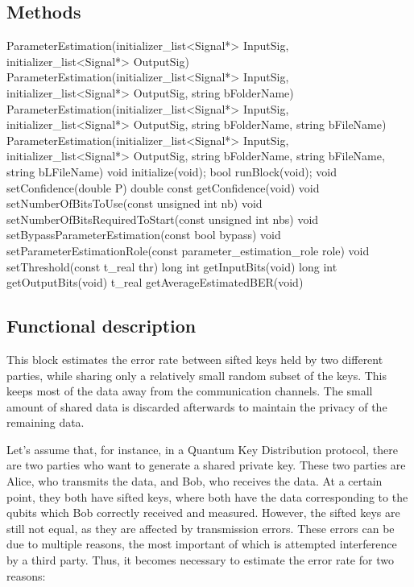 \subsection*{Methods}
\bigbreak	
ParameterEstimation(initializer\_list<Signal*> InputSig, initializer\_list<Signal*> OutputSig)
\bigbreak	
ParameterEstimation(initializer\_list<Signal*> InputSig,
initializer\_list<Signal*> OutputSig, string bFolderName)
\bigbreak	
ParameterEstimation(initializer\_list<Signal*> InputSig, initializer\_list<Signal*> OutputSig, string bFolderName, string bFileName)
\bigbreak	
ParameterEstimation(initializer\_list<Signal*> InputSig,
initializer\_list<Signal*> OutputSig, string bFolderName, string bFileName,
string bLFileName)
\bigbreak
void initialize(void);
\bigbreak	
bool runBlock(void);
\bigbreak
void setConfidence(double P)
\bigbreak
double const getConfidence(void)
\bigbreak
void setNumberOfBitsToUse(const unsigned int nb)
\bigbreak
void setNumberOfBitsRequiredToStart(const unsigned int nbs)
\bigbreak
void setBypassParameterEstimation(const bool bypass)
\bigbreak
void setParameterEstimationRole(const parameter\_estimation\_role role)
\bigbreak
void setThreshold(const t\_real thr)
\bigbreak
long int getInputBits(void)
\bigbreak
long int getOutputBits(void)
\bigbreak
t\_real getAverageEstimatedBER(void)
\bigbreak

\subsection*{Functional description}

This block estimates the error rate between sifted keys held by two different
parties, while sharing only a relatively small random subset of the keys. This
keeps most of the data away from the communication channels. The small
amount of shared data is discarded afterwards to maintain the privacy of the
remaining data.

Let's assume that, for instance, in a Quantum Key Distribution protocol, there
are two parties who want to generate a shared private key. These two parties are
Alice, who transmits the data, and Bob, who receives the data. At a certain
point, they both have sifted keys, where both have the data corresponding to the
qubits which Bob correctly received and measured. However, the sifted keys are
still not equal, as they are affected by transmission errors. These errors can
be due to multiple reasons, the most important of which is attempted
interference by a third party. Thus, it becomes necessary to estimate the error
rate for two reasons:

